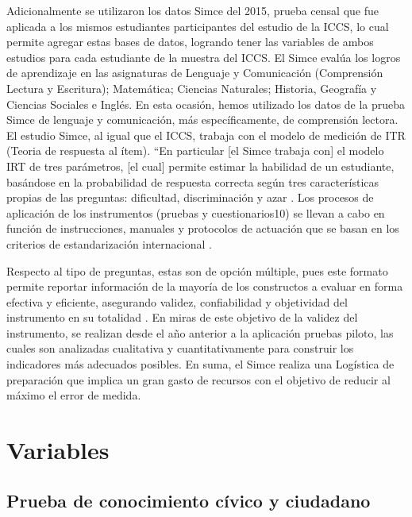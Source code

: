 \documentclass[12pt,twoside]{templates/facsothesis}
\begin{document}
Adicionalmente se utilizaron los datos Simce del 2015, prueba censal que fue aplicada a los mismos estudiantes participantes del estudio de la ICCS, lo cual permite agregar estas bases de datos, logrando tener las variables de ambos estudios para cada estudiante de la muestra del ICCS. El Simce evalúa los logros de aprendizaje en las asignaturas de Lenguaje y Comunicación (Comprensión Lectura y Escritura); Matemática; Ciencias Naturales; Historia, Geografía y Ciencias Sociales e Inglés. En esta ocasión, hemos utilizado los datos de la prueba Simce de lenguaje y comunicación, más específicamente, de comprensión lectora. El estudio Simce, al igual que el ICCS, trabaja con el modelo de medición de ITR (Teoria de respuesta al ítem). ``En particular {[}el Simce trabaja con{]} el modelo IRT de tres parámetros, {[}el cual{]} permite estimar la habilidad de un estudiante, basándose en la probabilidad de respuesta correcta según tres características propias de las preguntas: dificultad, discriminación y azar \citep{ace_Informe_2018}. Los procesos de aplicación de los instrumentos (pruebas y cuestionarios10) se llevan a cabo en función de instrucciones, manuales y protocolos de actuación que se basan en los criterios de estandarización internacional \citep{aera_Report_2011}.

Respecto al tipo de preguntas, estas son de opción múltiple, pues este formato permite reportar información de la mayoría de los constructos a evaluar en forma efectiva y eficiente, asegurando validez, confiabilidad y objetividad del instrumento en su totalidad \citep{rupp_Handbook_2008}. En miras de este objetivo de la validez del instrumento, se realizan desde el año anterior a la aplicación pruebas piloto, las cuales son analizadas cualitativa y cuantitativamente para construir los indicadores más adecuados posibles. En suma, el Simce realiza una Logística de preparación que implica un gran gasto de recursos con el objetivo de reducir al máximo el error de medida.

\hypertarget{variables}{%
\section{Variables}\label{variables}}

\hypertarget{prueba-de-conocimiento-cuxedvico-y-ciudadano}{%
\subsection{Prueba de conocimiento cívico y ciudadano}\label{prueba-de-conocimiento-cuxedvico-y-ciudadano}}
\end{document}
